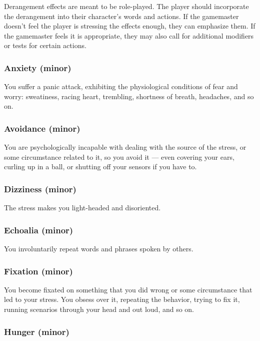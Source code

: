Derangement effects are meant to be role-played. The player should incorporate the derangement into their character’s words and actions. If the gamemaster doesn’t feel the player is stressing the effects enough, they can emphasize them. If the gamemaster feels it is appropriate, they may also call for additional modifiers or tests for certain actions.

\subsubsection{Anxiety (minor)}

You suffer a panic attack, exhibiting the physiological conditions of fear and worry: sweatiness, racing heart, trembling, shortness of breath, headaches, and so on.

\subsubsection{Avoidance (minor)}

You are psychologically incapable with dealing with the source of the stress, or some circumstance related to it, so you avoid it --- even covering your ears, curling up in a ball, or shutting off your sensors if you have to.

\subsubsection{Dizziness (minor)}

The stress makes you light-headed and disoriented.

\subsubsection{Echoalia (minor)}

You involuntarily repeat words and phrases spoken by others.

\subsubsection{Fixation (minor)}

You become fixated on something that you did wrong or some circumstance that led to your stress. You obsess over it, repeating the behavior, trying to fix it, running scenarios through your head and out loud, and so on.

\subsubsection{Hunger (minor)}

